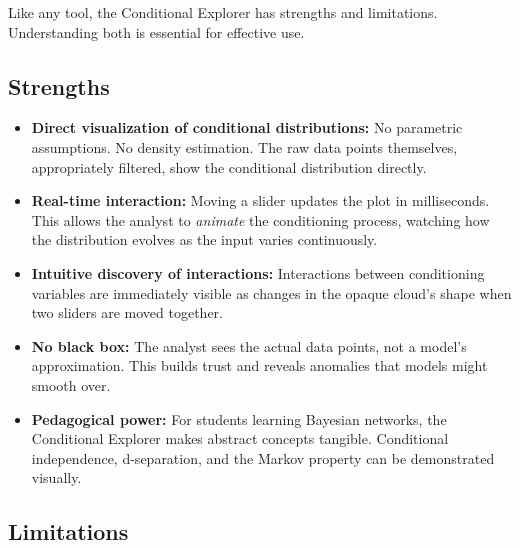Like any tool, the Conditional Explorer has strengths and limitations. Understanding both is essential for effective use.

\subsection{Strengths}

\begin{itemize}
    \item \textbf{Direct visualization of conditional distributions:} No parametric assumptions. No density estimation. The raw data points themselves, appropriately filtered, show the conditional distribution directly.
    \item \textbf{Real-time interaction:} Moving a slider updates the plot in milliseconds. This allows the analyst to \emph{animate} the conditioning process, watching how the distribution evolves as the input varies continuously.
    \item \textbf{Intuitive discovery of interactions:} Interactions between conditioning variables are immediately visible as changes in the opaque cloud's shape when two sliders are moved together.
    \item \textbf{No black box:} The analyst sees the actual data points, not a model's approximation. This builds trust and reveals anomalies that models might smooth over.
    \item \textbf{Pedagogical power:} For students learning Bayesian networks, the Conditional Explorer makes abstract concepts tangible. Conditional independence, d-separation, and the Markov property can be demonstrated visually.
\end{itemize}

\subsection{Limitations}


